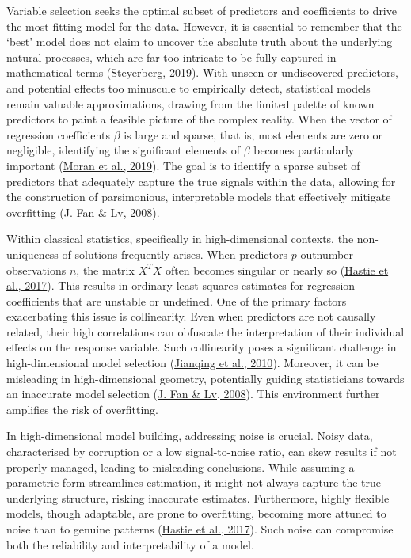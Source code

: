 \documentclass[
  11pt,
]{article}
\begin{document}
Variable selection seeks the optimal subset of predictors and
coefficients to drive the most fitting model for the data. However, it
is essential to remember that the `best' model does not claim to uncover
the absolute truth about the underlying natural processes, which are far
too intricate to be fully captured in mathematical terms
(\protect\hyperlink{ref-Ewout2019}{Steyerberg, 2019}). With unseen or
undiscovered predictors, and potential effects too minuscule to
empirically detect, statistical models remain valuable approximations,
drawing from the limited palette of known predictors to paint a feasible
picture of the complex reality. When the vector of regression
coefficients \(\beta\) is large and sparse, that is, most elements are
zero or negligible, identifying the significant elements of \(\beta\)
becomes particularly important (\protect\hyperlink{ref-Moran2019}{Moran
et al., 2019}). The goal is to identify a sparse subset of predictors
that adequately capture the true signals within the data, allowing for
the construction of parsimonious, interpretable models that effectively
mitigate overfitting (\protect\hyperlink{ref-Fan2008}{J. Fan \& Lv,
2008}).

Within classical statistics, specifically in high-dimensional contexts,
the non-uniqueness of solutions frequently arises. When predictors \(p\)
outnumber observations \(n\), the matrix \(X^TX\) often becomes singular
or nearly so (\protect\hyperlink{ref-Hastie2017}{Hastie et al., 2017}).
This results in ordinary least squares estimates for regression
coefficients that are unstable or undefined. One of the primary factors
exacerbating this issue is collinearity. Even when predictors are not
causally related, their high correlations can obfuscate the
interpretation of their individual effects on the response variable.
Such collinearity poses a significant challenge in high-dimensional
model selection (\protect\hyperlink{ref-Jianqing2010}{Jianqing et al.,
2010}). Moreover, it can be misleading in high-dimensional geometry,
potentially guiding statisticians towards an inaccurate model selection
(\protect\hyperlink{ref-Fan2008}{J. Fan \& Lv, 2008}). This environment
further amplifies the risk of overfitting.

In high-dimensional model building, addressing noise is crucial. Noisy
data, characterised by corruption or a low signal-to-noise ratio, can
skew results if not properly managed, leading to misleading conclusions.
While assuming a parametric form streamlines estimation, it might not
always capture the true underlying structure, risking inaccurate
estimates. Furthermore, highly flexible models, though adaptable, are
prone to overfitting, becoming more attuned to noise than to genuine
patterns (\protect\hyperlink{ref-Hastie2017}{Hastie et al., 2017}). Such
noise can compromise both the reliability and interpretability of a
model.
\end{document}
